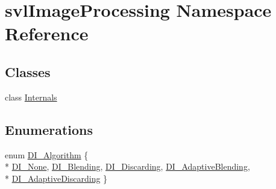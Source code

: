 \hypertarget{namespacesvl_image_processing}{\section{svl\-Image\-Processing Namespace Reference}
\label{namespacesvl_image_processing}
}
\subsection*{Classes}
\begin{DoxyCompactItemize}
\item 
class \hyperlink{classsvl_image_processing_1_1_internals}{Internals}
\end{DoxyCompactItemize}
\subsection*{Enumerations}
\begin{DoxyCompactItemize}
\item 
enum \hyperlink{namespacesvl_image_processing_a52b75591f8aa2cf8a2b4ea843b2f864a}{D\-I\-\_\-\-Algorithm} \{ \\*
\hyperlink{namespacesvl_image_processing_a52b75591f8aa2cf8a2b4ea843b2f864aa73d04fb676b1d8a4eb2e107629637e10}{D\-I\-\_\-\-None}, 
\hyperlink{namespacesvl_image_processing_a52b75591f8aa2cf8a2b4ea843b2f864aa228be787d8eacef51545d7b0e5d834c6}{D\-I\-\_\-\-Blending}, 
\hyperlink{namespacesvl_image_processing_a52b75591f8aa2cf8a2b4ea843b2f864aa8c3cd58f7894507f4629c50b465d8623}{D\-I\-\_\-\-Discarding}, 
\hyperlink{namespacesvl_image_processing_a52b75591f8aa2cf8a2b4ea843b2f864aae669a1776585899a84ae392a39a02ddb}{D\-I\-\_\-\-Adaptive\-Blending}, 
\\*
\hyperlink{namespacesvl_image_processing_a52b75591f8aa2cf8a2b4ea843b2f864aa7c0ad13a0502df7b0ebef799a51d9c4e}{D\-I\-\_\-\-Adaptive\-Discarding}
 \}
\end{DoxyCompactItemize}
